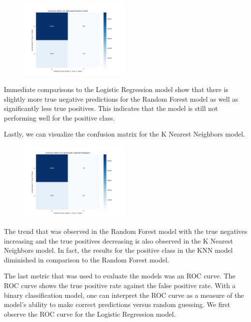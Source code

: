 \begin{figure}[h]
    \centering
    \includegraphics[width=0.5\textwidth]{"Images/RF CM.png"}
\end{figure}

Immediate comparisons to the Logistic Regression model show that there is slightly more true negative predictions for the Random Forest model as well as significantly less true positives. This indicates that the model is still not
performing well for the positive class.

Lastly, we can visualize the confusion matrix for the K Nearest Neighbors model.

\begin{figure}[h]
    \centering
    \includegraphics[width=0.5\textwidth]{"Images/KNN CM.png"}
\end{figure}

The trend that was observed in the Random Forest model with the true negatives increasing and the true positives decreasing is also observed in the K Nearest Neighbors model. In fact, the results for the positive class in the KNN model
diminished in comparison to the Random Forest model.


The last metric that was used to evaluate the models was an ROC curve. The ROC curve shows the true positive rate against the false positive rate. With a binary classification model, one can interpret the ROC curve as a measure of the model's
ability to make correct predictions versus random guessing. We first observe the ROC curve for the Logistic Regression model. 


